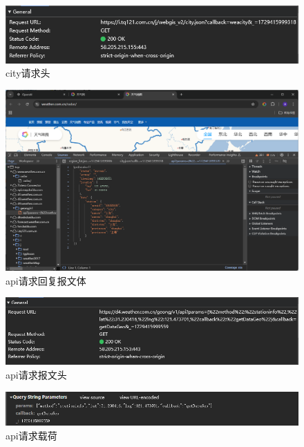 \begin{figure}[!htbp]
    \centering
    \includegraphics[width=\textwidth]{figures/city_js_head.png}
    \caption{city请求头}\label{cityjshead}
\end{figure}


\begin{figure}[!htbp]
    \centering
    \includegraphics[width=\textwidth]{figures/city_info_content.png}
    \caption{api请求回复报文体}\label{cityinfocontent}
\end{figure}

\begin{figure}[!htbp]
    \centering
    \includegraphics[width=\textwidth]{figures/city_info_head.png}
    \caption{api请求报文头}\label{cityinfohead}
\end{figure}

\begin{figure}[!htbp]
    \centering
    \includegraphics[width=\textwidth]{figures/city_info_load.png}
    \caption{api请求载荷}\label{cityinfoload}
\end{figure}

